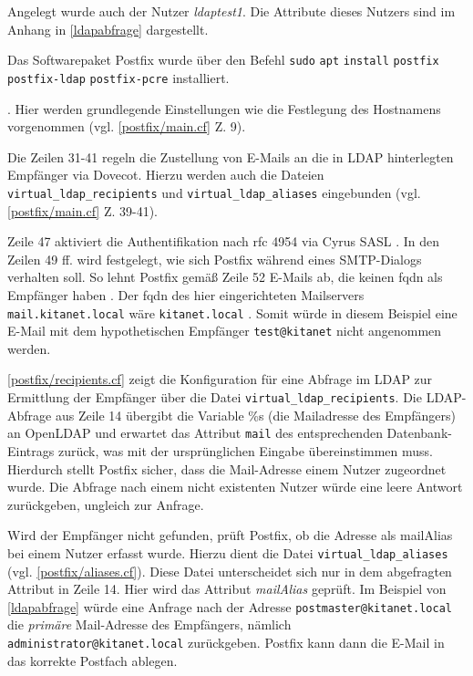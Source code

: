 Angelegt wurde auch der Nutzer \textit{ldaptest1}. Die Attribute dieses Nutzers sind im Anhang in \autoref{ldapabfrage} dargestellt.

Das Softwarepaket Postfix wurde über den Befehl \verb+sudo+ \verb+apt+ \verb+install+ \verb+postfix+ \\ \verb+postfix-ldap+ \verb+postfix-pcre+ installiert. 

 \citep[][308]{Deimeke2019}.
Hier werden grundlegende Einstellungen wie die Festlegung des Hostnamens vorgenommen (vgl. \autoref{postfix/main.cf} Z. 9).

Die Zeilen 31-41 regeln die Zustellung von E-Mails an die in LDAP hinterlegten Empfänger via Dovecot. Hierzu werden auch die  Dateien \verb+virtual_ldap_recipients+ und \verb+virtual_ldap_aliases+ eingebunden (vgl. \autoref{postfix/main.cf} Z. 39-41).

Zeile 47 aktiviert die Authentifikation nach \ac{rfc} 4954 via Cyrus SASL \citep[vgl.][3]{rfc4954}.
In den Zeilen 49 ff. wird festgelegt, wie sich Postfix während eines SMTP-Dialogs verhalten soll.
So lehnt Postfix \zb gemäß Zeile 52 E-Mails ab, die keinen \ac{fqdn} als Empfänger haben \citep[vgl.][]{postfixfqdn}. 
Der \ac{fqdn} des hier eingerichteten Mailservers \verb+mail.kitanet.local+ wäre \zb \verb+kitanet.local+ \citep[vgl.][]{fqdn}. 
Somit würde in diesem Beispiel eine E-Mail mit dem hypothetischen Empfänger \verb+test@kitanet+ nicht angenommen werden.

\autoref{postfix/recipients.cf} zeigt die Konfiguration für eine Abfrage im LDAP zur Ermittlung der Empfänger über die Datei \verb+virtual_ldap_recipients+.
Die LDAP-Abfrage aus Zeile 14 übergibt die Variable \%s (die Mailadresse des Empfängers) an OpenLDAP und erwartet das Attribut \verb+mail+ des entsprechenden Datenbank-Eintrags zurück, was mit der ursprünglichen Eingabe übereinstimmen muss. Hierdurch stellt Postfix sicher, dass die Mail-Adresse einem Nutzer zugeordnet wurde. Die Abfrage nach einem nicht existenten Nutzer würde eine leere Antwort zurückgeben, ungleich zur Anfrage.

Wird der Empfänger nicht gefunden, prüft Postfix, ob die Adresse als mailAlias bei einem Nutzer erfasst wurde. Hierzu dient die Datei \verb+virtual_ldap_aliases+ (vgl. \autoref{postfix/aliases.cf}). 
Diese Datei unterscheidet sich nur in dem abgefragten Attribut in Zeile 14. 
Hier wird das Attribut \textit{mailAlias} geprüft. 
Im Beispiel von \autoref{ldapabfrage} würde eine Anfrage nach der Adresse \verb+postmaster@kitanet.local+ die \textit{primäre} Mail-Adresse des Empfängers, nämlich \verb+administrator@kitanet.local+ zurückgeben. 
Postfix kann dann die E-Mail in das korrekte Postfach ablegen.

